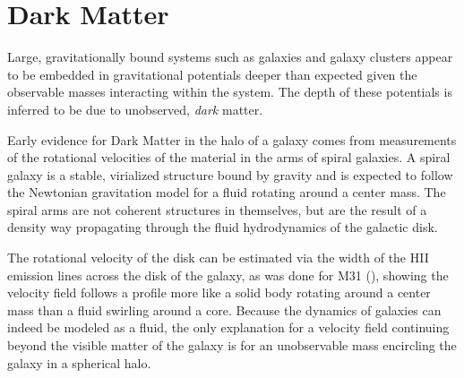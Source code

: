 \documentclass{paper}
\begin{document}
\section{Dark Matter}
  Large, gravitationally bound systems such as galaxies and galaxy clusters 
  appear to be embedded in gravitational potentials deeper than expected given 
  the observable masses interacting within the system. The depth of these 
  potentials is inferred to be due to unobserved, \textit{dark} matter.

  Early evidence for Dark Matter in the halo of a galaxy comes from
  measurements of the rotational velocities of the material in the arms of
  spiral galaxies. A spiral galaxy is a stable, virialized structure bound by
  gravity and is expected to follow the Newtonian gravitation model for a
  fluid rotating around a center mass. The spiral arms are not coherent
  structures in themselves, but are the result of a density way propagating 
  through the fluid hydrodynamics of the galactic disk. 

  The rotational velocity of the disk can be estimated via the 
  width of the HII emission lines across the disk of the galaxy, as was done
  for M31 (\cite{1970ApJ...159..379R}), showing the velocity field follows a 
  profile more like a solid body rotating around a center mass than a fluid 
  swirling around a core. Because the dynamics of galaxies can indeed be 
  modeled as a fluid, the only explanation for a velocity field continuing 
  beyond the visible matter of the galaxy is for an unobservable mass 
  encircling the galaxy in a spherical halo.
\end{document}
